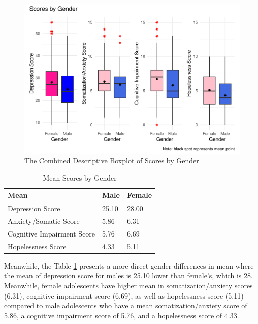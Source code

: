 \documentclass[
  man,floatsintext]{apa6}
\begin{document}
\begin{figure}
\centering
\includegraphics{final_files/figure-latex/boxplot-score-gender-1.pdf}
\caption{\label{fig:boxplot-score-gender}The Combined Descriptive Boxplot of Scores by Gender}
\end{figure}

\begin{table}[tbp]

\begin{center}
\begin{threeparttable}

\caption{\label{tab:table-mean-gender}Mean Scores by Gender}

\begin{tabular}{lll}
\toprule
Mean & \multicolumn{1}{c}{Male} & \multicolumn{1}{c}{Female}\\
\midrule
Depression Score & 25.10 & 28.00\\
Anxiety/Somatic Score & 5.86 & 6.31\\
Cognitive Impairment Score & 5.76 & 6.69\\
Hopelessness Score & 4.33 & 5.11\\
\bottomrule
\end{tabular}

\end{threeparttable}
\end{center}

\end{table}

Meanwhile, the Table \ref{tab:table-mean-gender} presents a more direct gender differences in mean where the mean of depression score for males is 25.10 lower than female's, which is 28. Meanwhile, female adolescents have higher mean in somatization/anxiety scores (6.31), cognitive impairment score (6.69), as well as hopelessness score (5.11) compared to male adolescents who have a mean somatization/anxiety score of 5.86, a cognitive impairment score of 5.76, and a hopelessness score of 4.33.
\end{document}
